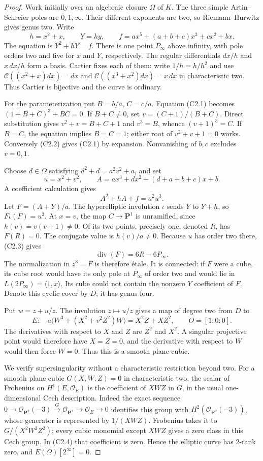 \begin{proof}
Work initially over an algebraic closure $\Omega$ of $K$. The three
simple Artin--Schreier poles are $0,1,\infty$. Their different
exponents are two, so Riemann--Hurwitz gives genus two. Write
\[
 h=x^2+x,\qquad Y=h y,\qquad
 f=a x^5+(a+b+c)x^3+c x^2+b x.
\]
The equation is $Y^2+hY=f$. There is one point $P_\infty$ above
infinity, with pole orders two and five for $x$ and $Y$, respectively.
The regular differentials $dx/h$ and $x\,dx/h$ form a basis. Cartier
fixes each of them: write $1/h=h/h^2$ and use
$\mathcal C((x^2+x)dx)=dx$ and
$\mathcal C((x^3+x^2)dx)=x\,dx$ in characteristic two.
Thus Cartier is bijective and the curve is ordinary.

For the parameterization put $B=b/a$, $C=c/a$. Equation (C2.1)
becomes $(1+B+C)^3+BC=0$. If $B+C\ne0$, set
$v=(C+1)/(B+C)$. Direct substitution gives
$v^2+v=B+C+1$ and $v^3=B$, whence $(v+1)^3=C$.
If $B=C$, the equation implies $B=C=1$; either root of
$v^2+v+1=0$ works. Conversely (C2.2) gives (C2.1) by expansion.
Nonvanishing of $b,c$ excludes $v=0,1$.

Choose $d\in\Omega$ satisfying $d^2+d=a^2v^2+a$, and set
\[
 u=x^2+v^2,\qquad
 A=a x^3+d x^2+(d+a+b+c)x+b.
\]
A coefficient calculation gives
\[
                  A^2+hA+f=a^2u^3.                          \tag{C2.3}
\]
Let $F=(A+Y)/a$. The hyperelliptic involution $\iota$ sends
$Y$ to $Y+h$, so $F\iota(F)=u^3$. At $x=v$, the map
$C\to\mathbf P^1$ is unramified, since $h(v)=v(v+1)\ne0$.
Of its two points, precisely one, denoted $R$, has $F(R)=0$.
The conjugate value is $h(v)/a\ne0$. Because $u$ has order two
there, (C2.3) gives
\[
                 \operatorname{div}(F)=6R-6P_\infty.
\]
The normalization in $z^3=F$ is therefore \'etale. It is connected:
if $F$ were a cube, its cube root would have its only pole at
$P_\infty$ of order two and would lie in
$L(2P_\infty)=\langle1,x\rangle$. Its cube could not contain the
nonzero $Y$ coefficient of $F$. Denote this cyclic cover by $D$;
it has genus four.

Put $w=z+u/z$. The involution $z\mapsto u/z$ gives a map of
degree two from $D$ to
\[
 E:\quad a\bigl(W^3+(X^2+v^2Z^2)W\bigr)=X^2Z+XZ^2,
 \qquad O=[1:0:0].                                          \tag{C2.4}
\]
The derivatives with respect to $X$ and $Z$ are $Z^2$ and
$X^2$. A singular projective point would therefore have $X=Z=0$,
and the derivative with respect to $W$ would then force $W=0$.
Thus this is a smooth plane cubic.

We verify supersingularity without a characteristic restriction beyond
two. For a smooth plane cubic $G(X,W,Z)=0$ in characteristic two,
the scalar of Frobenius on $H^1(E,\mathcal O_E)$ is the coefficient
of $XWZ$ in $G$, in the usual one-dimensional Cech description.
Indeed the exact sequence
$0\to\mathcal O_{\mathbf P^2}(-3)\xrightarrow{G}
\mathcal O_{\mathbf P^2}\to\mathcal O_E\to0$
identifies this group with $H^2(\mathcal O_{\mathbf P^2}(-3))$,
whose generator is represented by $1/(XWZ)$. Frobenius takes it
to $G/(X^2W^2Z^2)$; every cubic monomial except $XWZ$ gives a
zero class in this Cech group. In (C2.4) that coefficient is zero.
Hence the elliptic curve has $2$-rank zero, and
$E(\Omega)[2^\infty]=0$.


\end{proof}
